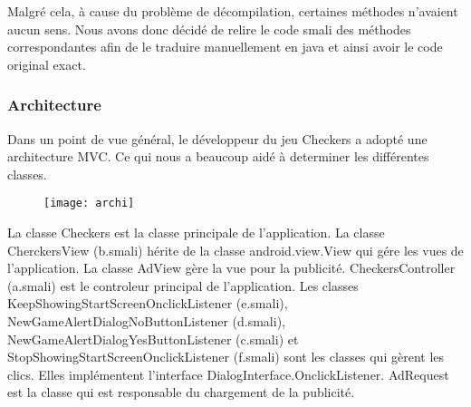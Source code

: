 Malgré cela, à cause du problème de décompilation, certaines méthodes n'avaient aucun sens.
Nous avons donc décidé de relire le code smali des méthodes correspondantes afin de le traduire manuellement en java et ainsi avoir le code original exact.

\subsubsection{Architecture}
Dans un point de vue général, le développeur du jeu Checkers a adopté une architecture MVC.
Ce qui nous a beaucoup aidé à determiner les différentes classes.\\
\begin{figure}[!h]
	      \begin{center}
		\texttt{[image: archi]}
	      \end{center}
\end{figure}
La classe Checkers est la classe principale de l’application.
La classe CherckersView (b.smali) hérite de la classe android.view.View qui gére les vues de l’application. La classe AdView gère la vue pour la publicité.
CheckersController (a.smali) est le controleur principal de l’application. Les classes KeepShowingStartScreenOnclickListener (e.smali), NewGameAlertDialogNoButtonListener (d.smali), NewGameAlertDialogYesButtonListener (c.smali) et StopShowingStartScreenOnclickListener (f.smali) sont les classes qui gèrent les clics.
Elles implémentent l'interface DialogInterface.OnclickListener.
AdRequest est la classe qui est responsable du chargement de la publicité.
